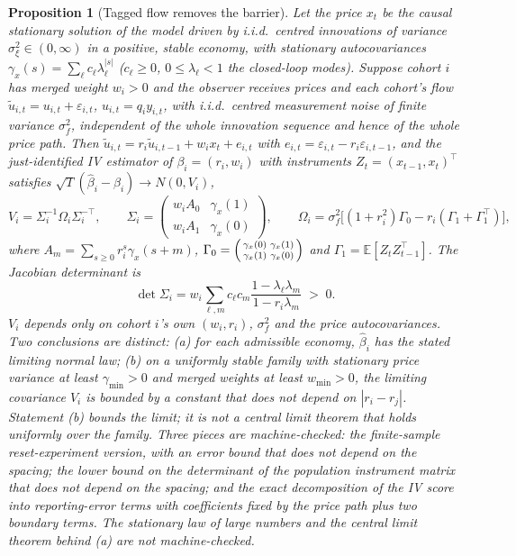 \documentclass[12pt]{article}
\newtheorem{proposition}[theorem]{Proposition}
\theoremstyle{definition}
\theoremstyle{remark}
\newcommand{\E}{\mathbb{E}}
\begin{document}
\begin{proposition}[Tagged flow removes the barrier]\label{prop:tagged}
Let the price $x_t$ be the causal stationary solution of the model driven by i.i.d.\ centred innovations of variance $\sigma_\xi^2\in(0,\infty)$ in a positive, stable economy, with stationary autocovariances $\gamma_x(s)=\sum_\ell c_\ell\lambda_\ell^{|s|}$ ($c_\ell\ge0$, $0\le\lambda_\ell<1$ the closed-loop modes). Suppose cohort $i$ has merged weight $w_i>0$ and the observer receives prices and each cohort's flow $\tilde u_{i,t}=u_{i,t}+\varepsilon_{i,t}$, $u_{i,t}=q_iy_{i,t}$, with i.i.d.\ centred measurement noise of finite variance $\sigma_f^2$, independent of the whole innovation sequence and hence of the whole price path. Then $\tilde u_{i,t}=r_i\tilde u_{i,t-1}+w_ix_t+e_{i,t}$ with $e_{i,t}=\varepsilon_{i,t}-r_i\varepsilon_{i,t-1}$, and the just-identified IV estimator of $\beta_i=(r_i,w_i)$ with instruments $Z_t=(x_{t-1},x_t)^\top$ satisfies $\sqrt T(\hat\beta_i-\beta_i)\to N(0,V_i)$,
\begin{equation}\label{eq:ivvar}
V_i=\Sigma_i^{-1}\Omega_i\Sigma_i^{-\top},\qquad \Sigma_i=\begin{pmatrix}w_iA_0&\gamma_x(1)\\ w_iA_1&\gamma_x(0)\end{pmatrix},\qquad \Omega_i=\sigma_f^2\bigl[(1+r_i^2)\Gamma_0-r_i(\Gamma_1+\Gamma_1^\top)\bigr],
\end{equation}
where $A_m=\sum_{s\ge0}r_i^s\gamma_x(s+m)$, $\Gamma_0=\begin{psmallmatrix}\gamma_x(0)&\gamma_x(1)\\ \gamma_x(1)&\gamma_x(0)\end{psmallmatrix}$ and $\Gamma_1=\E[Z_tZ_{t-1}^\top]$. The Jacobian determinant is
\begin{equation}\label{eq:ivdet}
\det\Sigma_i=w_i\sum_{\ell,m}c_\ell c_m\frac{1-\lambda_\ell\lambda_m}{1-r_i\lambda_m}\;>\;0 .
\end{equation}
$V_i$ depends only on cohort $i$'s own $(w_i,r_i)$, $\sigma_f^2$ and the price autocovariances. Two conclusions are distinct: (a) for each admissible economy, $\hat\beta_i$ has the stated limiting normal law; (b) on a uniformly stable family with stationary price variance at least $\gamma_{\min}>0$ and merged weights at least $w_{\min}>0$, the limiting covariance $V_i$ is bounded by a constant that does not depend on $|r_i-r_j|$. Statement (b) bounds the limit; it is not a central limit theorem that holds uniformly over the family. Three pieces are machine-checked: the finite-sample reset-experiment version, with an error bound that does not depend on the spacing; the lower bound on the determinant of the population instrument matrix that does not depend on the spacing; and the exact decomposition of the IV score into reporting-error terms with coefficients fixed by the price path plus two boundary terms. The stationary law of large numbers and the central limit theorem behind (a) are not machine-checked.
\end{proposition}
\end{document}
